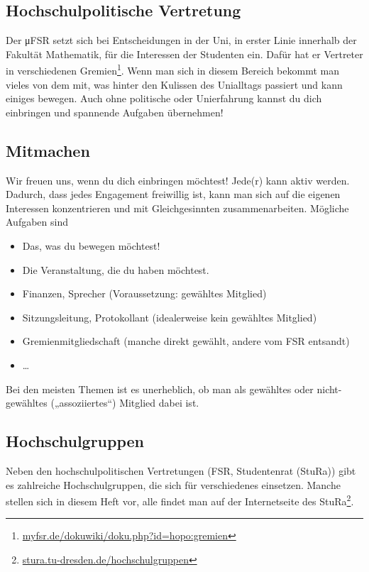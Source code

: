 \documentclass{scrartcl}
\begin{document}
\subsection{Hochschulpolitische Vertretung}
\label{sub:hochschulpolitische_vertretung}
Der μFSR setzt sich bei Entscheidungen in der Uni, in erster Linie innerhalb der Fakultät Mathematik,
für die Interessen der Studenten ein.
Dafür hat er Vertreter in verschiedenen Gremien\footnote{\url{myfsr.de/dokuwiki/doku.php?id=hopo:gremien}}.
Wenn man sich in diesem Bereich  bekommt man vieles von dem mit, was hinter den Kulissen
des Unialltags passiert und kann einiges bewegen.
Auch ohne politische oder Unierfahrung kannst du dich einbringen und spannende Aufgaben übernehmen!

\subsection{Mitmachen}
\label{sub:mitmachen}
Wir freuen uns, wenn du dich einbringen möchtest! Jede(r) kann aktiv werden.
Dadurch, dass jedes Engagement freiwillig ist, kann man sich auf die eigenen Interessen konzentrieren
und mit Gleichgesinnten zusammenarbeiten. Mögliche Aufgaben sind
\begin{itemize}
  \item Das, was du bewegen möchtest!
  \item Die Veranstaltung, die du haben möchtest.
  \item Finanzen, Sprecher (Voraussetzung: gewähltes Mitglied)
  \item Sitzungsleitung, Protokollant (idealerweise kein gewähltes Mitglied)
  \item Gremienmitgliedschaft (manche direkt gewählt, andere vom FSR entsandt)
  \item \dots
\end{itemize}
Bei den meisten Themen ist es unerheblich, ob man als gewähltes oder nicht-gewähltes („assoziiertes“) Mitglied dabei ist.

\subsection{Hochschulgruppen}
\label{sub:hochschulgruppen}
Neben den hochschulpolitischen Vertretungen (FSR, Studentenrat (StuRa)) gibt es zahlreiche Hochschulgruppen,
die sich für verschiedenes einsetzen. Manche stellen sich in diesem Heft vor, alle findet man auf der Internetseite des StuRa\footnote{\url{stura.tu-dresden.de/hochschulgruppen}}.
\end{document}

